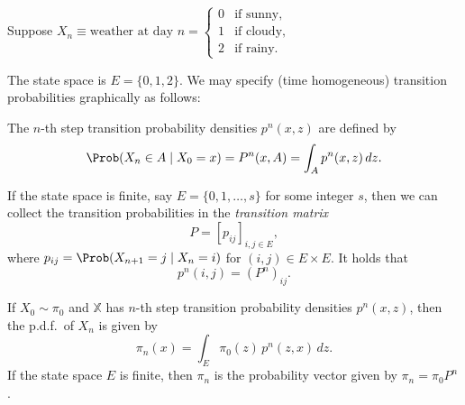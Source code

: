 \begin{example}
\label{ex:A.3}
Suppose $X_n \equiv \text{weather at day } n =
\begin{cases}
  0 & \text{if sunny,} \\
  1 & \text{if cloudy,} \\
  2 & \text{if rainy.}
\end{cases}$

The state space is $E = \{0, 1, 2\}$.  We may specify (time homogeneous) transition probabilities
graphically as follows:

\begin{center}
\end{center}
\end{example}

\begin{definition}
\label{def:A.4}
The $n$-th step transition probability densities $p^n(x, z)$ are defined by
\[
  \Prob(X_n \in A \mid X_0 = x) = P^n(x, A) = \int_A p^n(x, z)\, dz.
\]
\end{definition}

If the state space is finite, say $E = \{0, 1, \ldots, s\}$ for some integer $s$, then we can collect
the transition probabilities in the \emph{transition matrix}
\[
  P = [p_{ij}]_{i,j \in E},
\]
where $p_{ij} = \Prob(X_{n+1} = j \mid X_n = i)$ for $(i, j) \in E \times E$.  It holds that
\[
  p^n(i, j) = (P^n)_{ij}.
\]

\begin{lemma}
\label{lem:A.5}
If $X_0 \sim \pi_0$ and $\mathbb{X}$ has $n$-th step transition probability densities $p^n(x, z)$,
then the p.d.f.\ of $X_n$ is given by
\[
  \pi_n(x) = \int_E \pi_0(z)\, p^n(z, x)\, dz.
\]
If the state space $E$ is finite, then $\pi_n$ is the probability vector given by $\pi_n = \pi_0 P^n$.
\end{lemma}

